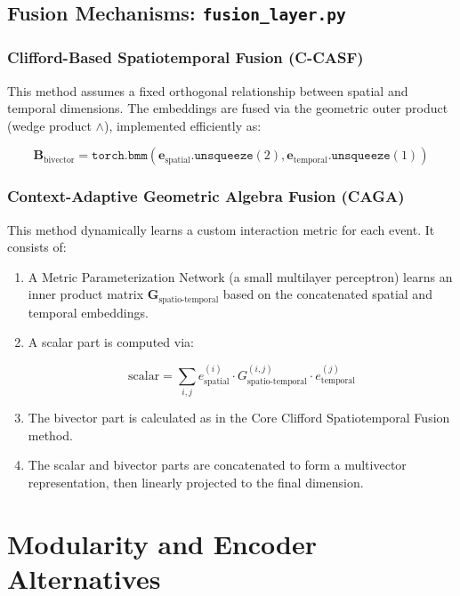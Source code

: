 \documentclass[11pt, a4paper]{article}
\begin{document}
\subsection{Fusion Mechanisms: \texttt{fusion\_layer.py}}

\subsubsection*{Clifford-Based Spatiotemporal Fusion (C-CASF)}
This method assumes a fixed orthogonal relationship between spatial and temporal dimensions. The embeddings are fused via the geometric outer product (wedge product $\wedge$), implemented efficiently as:

\begin{equation}
\mathbf{B}_{\text{bivector}} = \texttt{torch.bmm}(\mathbf{e}_{\text{spatial}}.\texttt{unsqueeze}(2), \mathbf{e}_{\text{temporal}}.\texttt{unsqueeze}(1))
\end{equation}

\subsubsection*{Context-Adaptive Geometric Algebra Fusion (CAGA)}
This method dynamically learns a custom interaction metric for each event. It consists of:

\begin{enumerate}
    \item A Metric Parameterization Network (a small multilayer perceptron) learns an inner product matrix $\mathbf{G}_{\text{spatio-temporal}}$ based on the concatenated spatial and temporal embeddings.
    \item A scalar part is computed via:

    \[
    \text{scalar} = \sum_{i,j} e^{(i)}_{\text{spatial}} \cdot G^{(i,j)}_{\text{spatio-temporal}} \cdot e^{(j)}_{\text{temporal}}
    \]

    \item The bivector part is calculated as in the Core Clifford Spatiotemporal Fusion method.
    \item The scalar and bivector parts are concatenated to form a multivector representation, then linearly projected to the final dimension.
\end{enumerate}

\section{Modularity and Encoder Alternatives}
\end{document}
